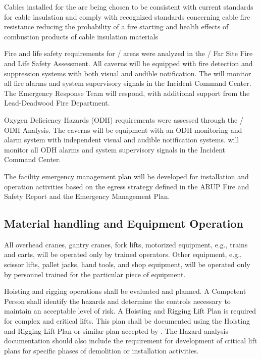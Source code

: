 Cables installed for the  are being chosen to be
consistent with current \fnal standards for cable insulation and
comply with recognized standards concerning cable fire resistance
reducing the probability of a fire starting and health effects of
combustion products of cable insulation materials

Fire and life safety requirements for / areas
were analyzed in the / Far Site Fire and Life
Safety Assessment. All caverns will be equipped with fire detection
and suppression systems with both visual and audible notification. The
\surf will monitor all fire alarms and system supervisory signals in
the \surf Incident Command Center.  The \surf Emergency Response Team
will respond, with additional support from the Lead-Deadwood Fire
Department.

Oxygen Deficiency Hazards (ODH) requirements were assessed through the
/ ODH Analysis. The caverns will be equipment
with an ODH monitoring and alarm system with independent visual and
audible notification systems. \surf will monitor all ODH alarms and
system supervisory signals in the \surf Incident Command Center.

The facility emergency management plan will be developed for
installation and operation activities based on the egress strategy
defined in the ARUP Fire and Safety Report and the \surf Emergency
Management Plan.

\subsection{Material handling and Equipment Operation}

All overhead cranes, gantry cranes, fork lifts, motorized equipment,
e.g., trains and carts, will be operated only by trained
operators. Other equipment, e.g., scissor lifts, pallet jacks, hand
tools, and shop equipment, will be operated only by personnel trained
for the particular piece of equipment.

Hoisting and rigging operations shall be evaluated and planned.  A
Competent Person shall identify the hazards and determine the controls
necessary to maintain an acceptable level of risk.  A Hoisting and
Rigging Lift Plan is required for complex and critical lifts. This
plan shall be documented using the \fnal Hoisting and Rigging Lift
Plan or similar plan accepted by \fnal. The Hazard analysis
documentation should also include the requirement for development of
critical lift plans for specific phases of demolition or installation
activities.

